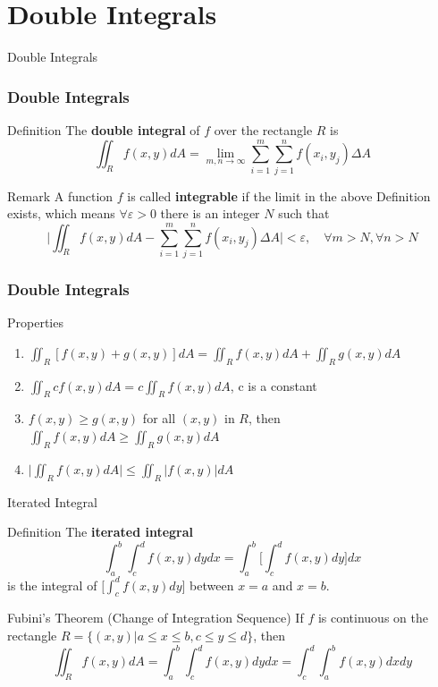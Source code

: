 \documentclass[aspectratio=169, UTF8]{beamer}
\begin{document}
\section{Double Integrals}
\begin{frame}[label=1]{Double Integrals}
    \frametitle{Double Integrals}
    \begin{block}{Definition}
        The \textbf{double integral} of $f$ over the rectangle $R$ is
        \begin{equation*}
            \iint_Rf(x,y)dA=\lim_{m,n\rightarrow\infty}\sum_{i=1}^m\sum_{j=1}^nf(x_i,y_j)\Delta A
        \end{equation*}
    \end{block}
    \begin{block}{Remark}
        A function $f$ is called \textbf{integrable} if the limit in the above Definition exists, which means $\forall \varepsilon>0$ there is an integer $N$ such that
        \begin{equation*}
            \Big|\iint_Rf(x,y)dA-\sum_{i=1}^m\sum_{j=1}^nf(x_i,y_j)\Delta A\Big |<\varepsilon,\quad \forall m>N, \forall n>N
        \end{equation*}
    \end{block}
\end{frame}
\begin{frame}
    \frametitle{Double Integrals}
    \begin{block}{Properties}
        \begin{enumerate}
            \item $\iint_R[f(x,y)+g(x,y)]dA=\iint_Rf(x,y)dA+\iint_Rg(x,y)dA$
            \item $\iint_Rcf(x,y)dA=c\iint_Rf(x,y)dA$, c is a constant
            \item $f(x,y)\geq g(x,y)$ for all $(x,y)$ in $R$, then $\iint_Rf(x,y)dA\geq \iint_Rg(x,y)dA$
            \item $\Big|\iint_Rf(x,y)dA\Big|\leq\iint_R|f(x,y)|dA$
        \end{enumerate}
    \end{block}

\end{frame}
\begin{frame}{Iterated Integral}
    \begin{block}{Definition}
        The \textbf{iterated integral}
        \begin{equation*}
            \int_a^b\int_c^df(x,y)dydx=\int_a^b\Big[\int_c^df(x,y)dy\Big]dx
        \end{equation*}
        is the integral of $\Big[\int_c^df(x,y)dy\Big]$ between $x=a$ and $x=b$.
    \end{block}
    \begin{block}{Fubini's Theorem (Change of Integration Sequence)}
        If $f$ is continuous on the rectangle $R=\{(x,y)|a\leq x\leq b,c\leq y\leq d\}$, then
        \begin{equation*}
            \iint_Rf(x,y)dA=\int_a^b\int_c^df(x,y)dydx=\int_c^d\int_a^bf(x,y)dxdy
        \end{equation*}
    \end{block}
\end{frame}
\end{document}
